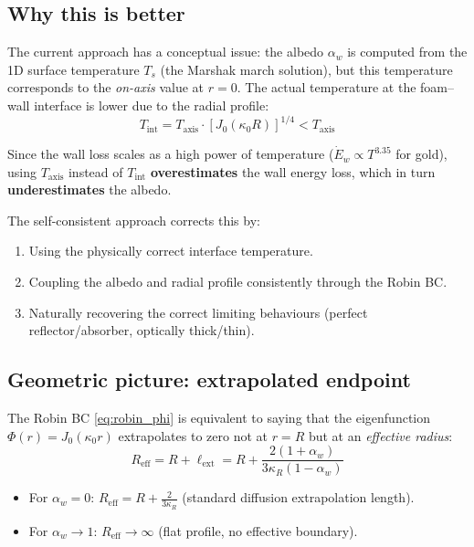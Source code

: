 \documentclass[12pt]{article}
\newcommand{\Ts}{T_s}
\newcommand{\lext}{\ell_{\mathrm{ext}}}
\newcommand{\alphaW}{\alpha_w}
\newcommand{\Ew}{\dot{E}_w}
\begin{document}
\subsection{Why this is better}

The current approach has a conceptual issue: the albedo $\alphaW$ is computed
from the 1D surface temperature $\Ts$ (the Marshak march solution), but this
temperature corresponds to the \emph{on-axis} value at $r = 0$. The actual
temperature at the foam--wall interface is lower due to the radial profile:
\begin{equation}
    T_{\mathrm{int}} = T_{\mathrm{axis}}\cdot[J_0(\kappa_0 R)]^{1/4} < T_{\mathrm{axis}}
\end{equation}

Since the wall loss scales as a high power of temperature
($\Ew \propto T^{3.35}$ for gold), using $T_{\mathrm{axis}}$ instead of
$T_{\mathrm{int}}$ \textbf{overestimates} the wall energy loss, which in turn
\textbf{underestimates} the albedo.

The self-consistent approach corrects this by:
\begin{enumerate}
    \item Using the physically correct interface temperature.
    \item Coupling the albedo and radial profile consistently through the
    Robin BC.
    \item Naturally recovering the correct limiting behaviours (perfect
    reflector/absorber, optically thick/thin).
\end{enumerate}

\subsection{Geometric picture: extrapolated endpoint}

The Robin BC \eqref{eq:robin_phi} is equivalent to saying that the
eigenfunction $\Phi(r) = J_0(\kappa_0 r)$ extrapolates to zero not at $r = R$
but at an \emph{effective radius}:
\begin{equation}
    R_{\mathrm{eff}} = R + \lext
    = R + \frac{2(1 + \alphaW)}{3\kappa_R(1 - \alphaW)}
\end{equation}

\begin{itemize}
    \item For $\alphaW = 0$: $R_{\mathrm{eff}} = R + \frac{2}{3\kappa_R}$
    (standard diffusion extrapolation length).
    \item For $\alphaW \to 1$: $R_{\mathrm{eff}} \to \infty$
    (flat profile, no effective boundary).
\end{itemize}
\end{document}
